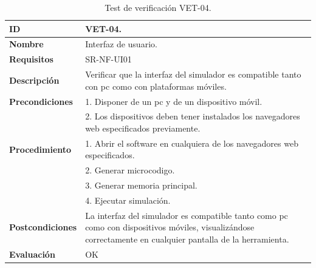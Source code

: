 \begin{center}
\begin{table}[htbp]
\centering
\caption{Test de verificación VET-04.}
\begin{tabular}{@{}p{2.5cm} p{13cm}@{}} 
\toprule
\textbf{ID} 					& VET-04. \\
\midrule
\textbf{Nombre} 				& Interfaz de usuario. \\
\midrule
\textbf{Requisitos} 		& SR-NF-UI01\\
\midrule
\textbf{Descripción} 		& Verificar que la interfaz del simulador es compatible tanto con \acrshort{pc} como con plataformas móviles. \\
\midrule
\textbf{Precondiciones}		& 1. Disponer de un \acrshort{pc} y de un dispositivo móvil. \\
											& 2. Los dispositivos deben tener instalados los navegadores web especificados previamente. \\
\midrule
\textbf{Procedimiento}			& 1. Abrir el \gls{software} en cualquiera de los navegadores web especificados. \\
							& 2. Generar \gls{microcodigo}.\\
							& 3. Generar memoria principal.\\
							& 4. Ejecutar simulación.\\
\midrule
\textbf{Postcondiciones} 		&  La interfaz del simulador es compatible tanto como \acrshort{pc} como con dispositivos móviles, visualizándose correctamente en cualquier pantalla de la herramienta.\\
\midrule
\textbf{Evaluación} 			& OK \\
\bottomrule
\end{tabular}
\label{tab:vet04}
\end{table}
\end{center}

